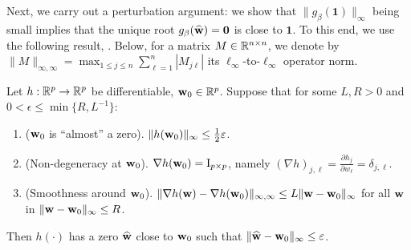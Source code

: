 \documentclass[times,sort&compress,3p]{elsarticle}
\begin{document}
Next, we carry out a perturbation argument: we show that $\|g_\beta(\bm{1})\|_\infty$ being small implies that the unique root $g_\beta(\widehat{{\bf w}})=\bm{0}$ is close to $\bm{1}$.
To this end, we use the following result,
 \cite[Lemma 3.1]{zhang2016marvcenko}. Below, for a matrix $M \in \mathbb{R}^{n\times n}$, we denote by $\|M\|_{\infty,\infty}=\max_{1\le j \le n} \sum_{\ell=1}^n |M_{j\ell}|$ its $\ell_\infty$-to-$\ell_\infty$ operator norm.
\begin{lemma}\label{lem:Tyl-perturb}
    Let $h:\mathbb{R}^p \to \mathbb{R}^p$ be differentiable, ${\bf w}_0\in \mathbb{R}^p$. Suppose that for
    some $L,R>0$ and $0<\epsilon \le \min\{R,L^{-1}\}$: 
\begin{enumerate}[label=(\Roman*)]
    \item (${\bf w}_0$ is ``almost'' a zero). $\|h({\bf w}_0)\|_\infty \le \frac12\varepsilon$.
    \item (Non-degeneracy at ${\bf w}_0$). $\nabla h({\bf w}_0) = \mathrm{I}_{p \times p}$, namely $\left(\nabla h\right)_{j,\ell}=\frac{\partial h_j}{\partial w_\ell} = \delta_{j,\ell}$. 
    \item (Smoothness around ${\bf w}_0$). $\|\nabla h({\bf w})-\nabla h({\bf w}_0)\|_{\infty,\infty} \le L\|{\bf w}-{\bf w}_0\|_\infty$ for all ${\bf w}$ in ${\|{\bf w}-{\bf w}_0\|_\infty\le R}$.
\end{enumerate}
Then $h(\cdot)$ has a zero $\widehat{{\bf w}}$ close to ${\bf w}_0$ such that $\|\widehat{{\bf w}}-{\bf w}_0\|_\infty \le \varepsilon$.  
\end{lemma}
\end{document}
